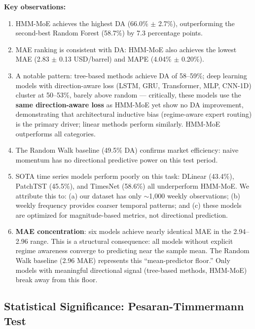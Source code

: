 \documentclass[3p,times]{elsarticle}
\begin{document}
\textbf{Key observations:}

\begin{enumerate}
\item HMM-MoE achieves the highest DA (66.0\% $\pm$ 2.7\%), outperforming the second-best Random Forest (58.7\%) by 7.3 percentage points.

\item MAE ranking is consistent with DA: HMM-MoE also achieves the lowest MAE (2.83 $\pm$ 0.13 USD/barrel) and MAPE (4.04\% $\pm$ 0.20\%).

\item A notable pattern: tree-based methods achieve DA of 58--59\%; deep learning models with direction-aware loss (LSTM, GRU, Transformer, MLP, CNN-1D) cluster at 50--53\%, barely above random --- critically, these models use the \textbf{same direction-aware loss} as HMM-MoE yet show no DA improvement, demonstrating that architectural inductive bias (regime-aware expert routing) is the primary driver; linear methods perform similarly. HMM-MoE outperforms all categories.

\item The Random Walk baseline (49.5\% DA) confirms market efficiency: naive momentum has no directional predictive power on this test period.

\item SOTA time series models perform poorly on this task: DLinear (43.4\%), PatchTST (45.5\%), and TimesNet (58.6\%) all underperform HMM-MoE. We attribute this to: (a) our dataset has only $\sim$1,000 weekly observations; (b) weekly frequency provides coarser temporal patterns; and (c) these models are optimized for magnitude-based metrics, not directional prediction.

\item \textbf{MAE concentration}: six models achieve nearly identical MAE in the 2.94--2.96 range. This is a structural consequence: all models without explicit regime awareness converge to predicting near the sample mean. The Random Walk baseline (2.96 MAE) represents this ``mean-predictor floor.'' Only models with meaningful directional signal (tree-based methods, HMM-MoE) break away from this floor.
\end{enumerate}

\subsection{Statistical Significance: Pesaran-Timmermann Test}
\label{sec:pt}
\end{document}
